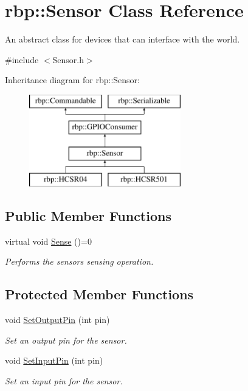 \hypertarget{classrbp_1_1Sensor}{}\section{rbp\+:\+:Sensor Class Reference}
\label{classrbp_1_1Sensor}


An abstract class for devices that can interface with the world.  




{\ttfamily \#include $<$Sensor.\+h$>$}

Inheritance diagram for rbp\+:\+:Sensor\+:\begin{figure}[H]
\begin{center}
\leavevmode
\includegraphics[height=4.000000cm]{classrbp_1_1Sensor}
\end{center}
\end{figure}
\subsection*{Public Member Functions}
\begin{DoxyCompactItemize}
\item 
virtual void \hyperlink{classrbp_1_1Sensor_ab9d45316bf67d871fddc7aa048e89c49}{Sense} ()=0
\begin{DoxyCompactList}\small\item\em Performs the sensor\textquotesingle{}s sensing operation. \end{DoxyCompactList}\end{DoxyCompactItemize}
\subsection*{Protected Member Functions}
\begin{DoxyCompactItemize}
\item 
void \hyperlink{classrbp_1_1Sensor_aab6baaef855fd31dab94e5b28386410a}{Set\+Output\+Pin} (int pin)
\begin{DoxyCompactList}\small\item\em Set an output pin for the sensor. \end{DoxyCompactList}\item 
void \hyperlink{classrbp_1_1Sensor_a2e3a00de93b77ecf39b4bfee79279c3c}{Set\+Input\+Pin} (int pin)
\begin{DoxyCompactList}\small\item\em Set an input pin for the sensor. \end{DoxyCompactList}\end{DoxyCompactItemize}


